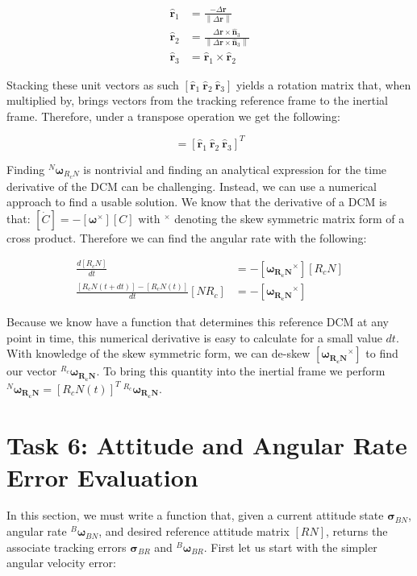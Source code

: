 \documentclass[paper]{aiaaNew}
\newcommand{\norm}[1]{\left\lVert#1\right\rVert}
\begin{document}
\begin{align}
  \hat{\bm{r}}_1 &= \frac{-\Delta\bm{r}}{\norm{\Delta\bm{r}}} \\ 
  \hat{\bm{r}}_2 &= \frac{\Delta\bm{r} \times \hat{\bm{n}}_3}{\norm{\Delta\bm{r} \times \hat{\bm{n}}_3}} \\ 
  \hat{\bm{r}}_3 &= \hat{\bm{r}}_1 \times \hat{\bm{r}}_2 
\end{align}

Stacking these unit vectors as such $[\hat{\bm{r}}_1 \ \hat{\bm{r}}_2 \ \hat{\bm{r}}_3 ]$ yields a rotation matrix that, when multiplied by, brings vectors from the tracking reference frame to the inertial frame. Therefore, under a transpose operation we get the following: 

\begin{equation}
  [R_cN] = [\hat{\bm{r}}_1 \ \hat{\bm{r}}_2 \ \hat{\bm{r}}_3 ]^T
\end{equation}

Finding $^N\bm{\omega}_{R_cN}$ is nontrivial and finding an analytical expression for the time derivative of the DCM can be challenging. Instead, we can use a numerical approach to find a usable solution. We know that the derivative of a DCM is that: $[\dot{C}] = -[\bm{\omega}^\times][C]$ with $^\times$ denoting the skew symmetric matrix form of a cross product. Therefore we can find the angular rate with the following:



\begin{align}
  \frac{d[R_cN]}{dt} &= -[\bm{\omega_{R_cN}}^\times][R_cN] \\
  \frac{[R_cN(t+dt)] - [R_cN(t)]}{dt} [NR_c] &= -[\bm{\omega_{R_cN}}^\times]
\end{align}

Because we know have a function that determines this reference DCM at any point in time, this numerical derivative is easy to calculate for a small value $dt$. With knowledge of the skew symmetric form, we can de-skew $[\bm{\omega_{R_cN}}^\times]$ to find our vector  $^{R_c}\bm{\omega_{R_cN}}$. To bring this quantity into the inertial frame we perform $^{N}\bm{\omega_{R_cN}} = [R_cN(t)]^T \ ^{R_c}\bm{\omega_{R_cN}}$.






\section*{Task 6: Attitude and Angular Rate Error Evaluation}
In this section, we must write a function that, given a current attitude state $\bm{\sigma}_{BN}$, angular rate $^B\bm{\omega}_{BN}$, and desired reference attitude matrix $[RN]$, returns the associate tracking errors $\bm{\sigma}_{BR}$ and $^B\bm{\omega}_{BR}$. First let us start with the simpler angular velocity error:
\end{document}
